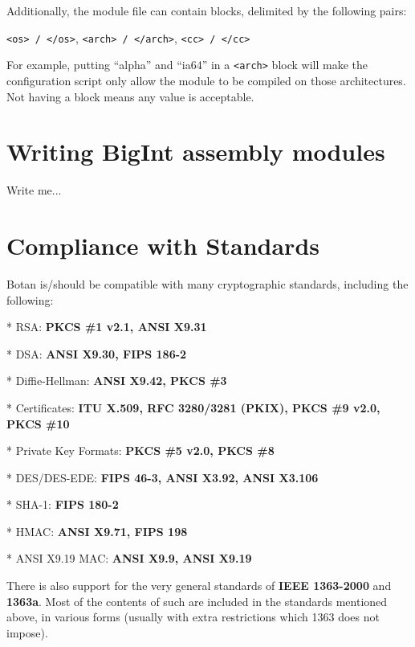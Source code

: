 \documentclass{article}
\begin{document}

\vskip 10pt
\noindent
Additionally, the module file can contain blocks, delimited by
the following pairs:

\texttt{<os> / </os>}, \texttt{<arch> / </arch>}, \texttt{<cc> / </cc>}

\noindent
For example, putting ``alpha'' and ``ia64'' in a \texttt{<arch>} block will
make the configuration script only allow the module to be compiled on those
architectures. Not having a block means any value is acceptable.

\section{Writing BigInt assembly modules}

Write me...

\pagebreak

\section{Compliance with Standards}

Botan is/should be compatible with many cryptographic standards, including the
following:

\newcommand{\standard}[2]{
   \vskip 4pt
   * #1: \textbf{#2}
}

\standard{RSA}{PKCS \#1 v2.1, ANSI X9.31}

\standard{DSA}{ANSI X9.30, FIPS 186-2}

\standard{Diffie-Hellman}{ANSI X9.42, PKCS \#3}

\standard{Certificates}{ITU X.509, RFC 3280/3281 (PKIX), PKCS \#9 v2.0,
PKCS \#10}

\standard{Private Key Formats}{PKCS \#5 v2.0, PKCS \#8}

\standard{DES/DES-EDE}{FIPS 46-3, ANSI X3.92, ANSI X3.106}

\standard{SHA-1}{FIPS 180-2}

\standard{HMAC}{ANSI X9.71, FIPS 198}

\standard{ANSI X9.19 MAC}{ANSI X9.9, ANSI X9.19}

\vskip 8pt
\noindent
There is also support for the very general standards of \textbf{IEEE 1363-2000}
and \textbf{1363a}. Most of the contents of such are included in the standards
mentioned above, in various forms (usually with extra restrictions which 1363
does not impose).
\end{document}
